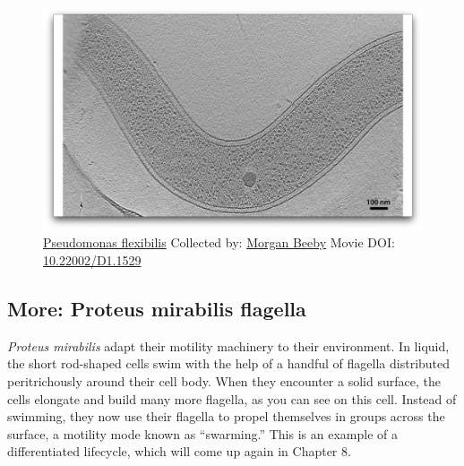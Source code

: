 \documentclass[]{tufte-book}
\begin{document}
\begin{figure}
\includegraphics{movie_stills/6_5} \caption[\protect\hyperlink{tree}{Pseudomonas flexibilis} Collected by:
\protect\hyperlink{morgan_beeby}{Morgan Beeby} Movie DOI:
\href{https://doi.org/10.22002/D1.1529}{10.22002/D1.1529}]{\protect\hyperlink{tree}{Pseudomonas flexibilis} Collected by:
\protect\hyperlink{morgan_beeby}{Morgan Beeby} Movie DOI:
\href{https://doi.org/10.22002/D1.1529}{10.22002/D1.1529}}\label{fig:6-5}
\end{figure}

\hypertarget{Proteus_mirabilis_flagella}{\subsection*{More: Proteus
mirabilis flagella}\label{Proteus_mirabilis_flagella}}

\emph{Proteus mirabilis} adapt their motility machinery to their
environment. In liquid, the short rod-shaped cells swim with the help of
a handful of flagella distributed peritrichously around their cell body.
When they encounter a solid surface, the cells elongate and build many
more flagella, as you can see on this cell. Instead of swimming, they
now use their flagella to propel themselves in groups across the
surface, a motility mode known as ``swarming.'' This is an example of a
differentiated lifecycle, which will come up again in Chapter 8.
\end{document}
